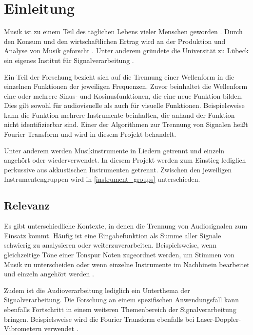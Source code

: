 \chapter{Einleitung}
%

Musik ist zu einem Teil des täglichen Lebens vieler Menschen geworden \parencite{musiknutzung}. Durch den Konsum und den wirtschaftlichen Ertrag wird an der Produktion und Analyse von Musik geforscht \parencite{absatz}. Unter anderem gründete die Universität zu Lübeck ein eigenes Institut für Signalverarbeitung \parencite{institute_for_signal_processing}.

\par

Ein Teil der Forschung bezieht sich auf die Trennung einer Wellenform in die einzelnen Funktionen der jeweiligen Frequenzen. Zuvor beinhaltet die Wellenform eine oder mehrere Sinus- und Kosinusfunktionen, die eine neue Funktion bilden. Dies gilt sowohl für audiovisuelle als auch für visuelle Funktionen. Beispielsweise kann die Funktion mehrere Instrumente beinhalten, die anhand der Funktion nicht identifizierbar sind. Einer der Algorithmen zur Trennung von Signalen heißt Fourier Transform und wird in diesem Projekt behandelt.

\par

Unter anderem werden Musikinstrumente in Liedern getrennt und einzeln angehört oder wiederverwendet. In diesem Projekt werden zum Einstieg lediglich perkussive aus akkustischen Instrumenten getrennt. Zwischen den jeweiligen Instrumentengruppen wird in \cref{instrument_groups} unterschieden.

%
\section{Relevanz}
%

Es gibt unterschiedliche Kontexte, in denen die Trennung von Audiosignalen zum Einsatz kommt. Häufig ist eine Eingabefunktion als Summe aller Signale schwierig zu analysieren oder weiterzuverarbeiten. Beispielsweise, wenn gleichzeitige Töne einer Tonspur Noten zugeordnet werden, um Stimmen von Musik zu unterscheiden oder wenn einzelne Instrumente im Nachhinein bearbeitet und einzeln angehört werden \parencite{importance_fourier}.

\par

Zudem ist die Audioverarbeitung lediglich ein Unterthema der Signalverarbeitung. Die Forschung an einem spezifischen Anwendungsfall kann ebenfalls Fortschritt in einem weiteren Themenbereich der Signalverarbeitung bringen. Beispielsweise wird die Fourier Transform ebenfalls bei Laser-Doppler-Vibrometern verwendet \parencite{Laser-Doppler-Vibrometer}.

